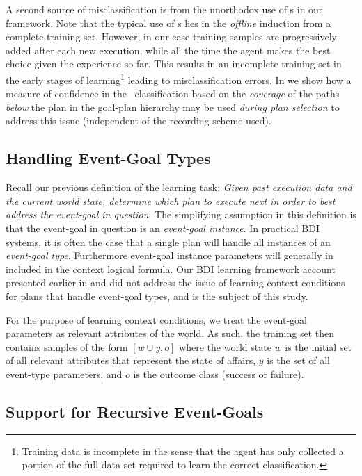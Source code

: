 A second source of misclassification is from the unorthodox use of \dt s in our framework. Note that the typical use of \dt s lies in the \textit{offline} induction from a complete training set. However, in our case training samples are progressively added after each new execution, while all the time the agent makes the best choice given the experience so far. This results in an incomplete training set in the early stages of learning\footnote{Training data is incomplete in the sense that the agent has only collected a portion of the full data set required to learn the correct classification.} leading to misclassification errors. In \cite{Singh:AAMAS10} we show how a measure of confidence in the \dt\ classification based on the \textit{coverage} of the paths \textit{below} the plan in the goal-plan hierarchy may be used \textit{during plan selection} to address this issue (independent of the recording scheme used).

\subsection{Handling Event-Goal Types}
Recall our previous definition of the learning task: \textit{Given past execution data and the current world state, determine which plan to execute next in order to best address the event-goal in question}. The simplifying assumption in this definition is that the event-goal in question is an \textit{event-goal instance}. In practical BDI systems, it is often the case that a single plan will handle all instances of an \textit{event-goal type}. Furthermore event-goal instance parameters will generally in included in the context logical formula. Our BDI learning framework account presented earlier in \cite{Airiau:IJAT:09} and \cite{Singh:AAMAS10} did not address the issue of learning context conditions for plans that handle event-goal types, and is the subject of this study.

For the purpose of learning context conditions, we treat the event-goal parameters as relevant attributes of the world. As such, the training set then contains samples of the form $[w \cup y,o]$ where the world state $w$ is the initial set of all relevant attributes that represent the state of affairs, $y$ is the set of all event-type parameters, and $o$ is the outcome class (success or failure). 

\subsection{Support for Recursive Event-Goals}

